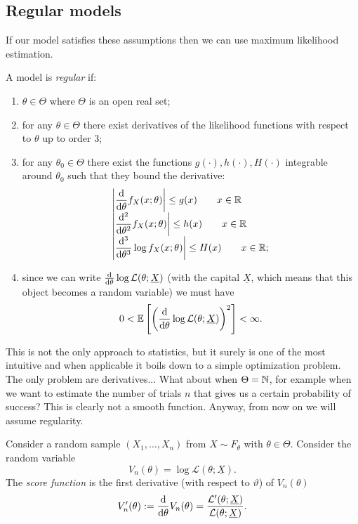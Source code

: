 \documentclass[12pt]{report}
\begin{document}
\subsection{Regular models}
If our model satisfies these assumptions then we can use maximum likelihood estimation.
\begin{definition}
	A model is \emph{regular} if:
	\begin{enumerate}[\circnum]
		\item $\theta\in\Theta$ where $\Theta$ is an open real set;
		\item for any $\theta\in\Theta$ there exist derivatives of the likelihood functions with respect to $\theta$ up to order $3$;   
		\item for any $\theta_{0}\in\Theta$ there exist the functions $g(\cdot),h(\cdot),H(\cdot)$ integrable around $\theta_{0}$ such that they bound the derivative:
		\begin{equation*}
			\begin{array}{>{\displaystyle}l}
				\left|\frac{\dif}{\dif\theta}f_{X}(x;\theta)\right|\leq g(x)\qquad x\in\R\\
				\left|\frac{\dif^{2}}{\dif\theta^{2}}f_{X}(x;\theta)\right|\leq h(x)\qquad x\in\R\\		
				\left|\frac{\dif^{3}}{\dif\theta^{3}}\log f_{X}(x;\theta)\right|\leq H(x)\qquad x\in\R;\\		
			\end{array}
		\end{equation*}
		\item since we can write $\frac{\mathop{}\!\mathrm{d}}{\mathop{}\!\mathrm{d}\theta}\log\mathcal{L}(\theta;\underline{X})$ (with the capital $\underline{X}$, which means that this object becomes a random variable) we must have
		\begin{equation*}
			0<\mathbb{E}\left[\left(\frac{\mathop{}\!\mathrm{d}}{\mathop{}\!\mathrm{d}\theta}\log\mathcal{L}(\theta;\underline{X})\right)^{2}\right]<\infty.
		\end{equation*}
	\end{enumerate}
\end{definition}
This is not the only approach to statistics, but it surely is one of the most intuitive and when applicable it boils down to a simple optimization problem. The only problem are derivatives... What about when $\Theta=\mathbb{N}$, for example when we want to estimate the number of trials $n$ that gives us a certain probability of success? This is clearly not a smooth function. Anyway, from now on we will assume regularity. \begin{definition}
	Consider a random sample $(X_{1},\ldots,X_{n})$ from $X\sim F_{\theta}$ with $\theta\in\Theta$. Consider the random variable
\begin{equation*}
	V_{n}(\theta)=\log\mathcal{L}(\theta;\underline{X}).
\end{equation*}
The \emph{score function} is the first derivative (with respect to $\vartheta$) of $V_{n}(\theta)$
\begin{equation*}
	V'_{n}(\theta):=\frac{\mathop{}\!\mathrm{d}}{\mathop{}\!\mathrm{d}\theta}V_{n}(\theta)=\frac{\mathcal{L}'(\theta;\underline{X})}{\mathcal{L}(\theta;\underline{X})}.
\end{equation*}

\end{definition}
\end{document}
